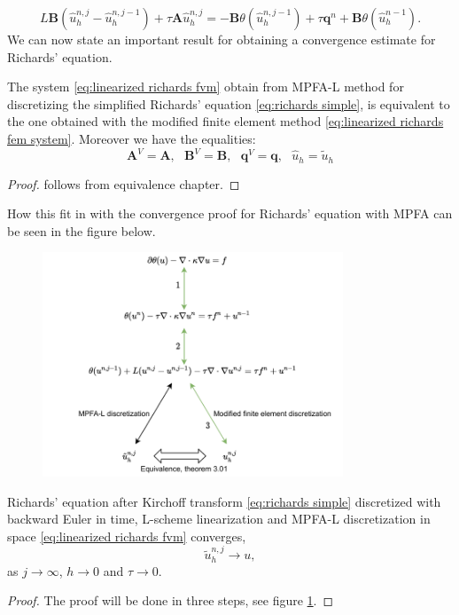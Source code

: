 \documentclass[../Main/main.tex]{subfiles}
\begin{document}
	\begin{equation}\label{eq:linearized richards fem system}
		L\pmb{B}(\hat{u}^{n,j}_h-\hat{u}^{n,j-1}_h) + \tau \pmb{A} \hat{u}_h^{n,j} = -\pmb{B} \theta (\hat{u}_h^{n,j-1})  + \tau \pmb{q}^n +  \pmb{B} \theta (\hat{u}_h^{n-1}).
	\end{equation}
	We can now state an important result for obtaining a convergence estimate for Richards' equation.
	\begin{lemma}
		The system \eqref{eq:linearized richards fvm} obtain from MPFA-L method for discretizing the simplified Richards' equation \eqref{eq:richards simple}, is equivalent to the one obtained with the modified finite element method \eqref{eq:linearized richards fem system}. Moreover we have the equalities: 
		\begin{equation}
			\pmb{A}^V = \pmb{A}, \ \ \ \pmb{B}^V = \pmb{B}, \ \ \ \pmb{q}^V = \pmb{q}, \ \ \ \hat{u}_h = \tilde{u}_h
		\end{equation}
		\begin{proof}
			follows from equivalence chapter.
		\end{proof}
	\end{lemma}
	How this fit in with the convergence proof for Richards' equation with MPFA can be seen in the figure below.
	\begin{figure}[H]
		\centering
		\includegraphics[width=0.8\textwidth]{convergence schema.pdf}
		\label{fig:convergence schema}
	\end{figure}
	\begin{theorem}
		Richards' equation after Kirchoff transform \eqref{eq:richards simple} discretized with backward Euler in time, L-scheme linearization and MPFA-L discretization in space \eqref{eq:linearized richards fvm} converges,
		\begin{equation}
			\tilde{u}_h^{n,j}\rightarrow u,
		\end{equation}
		as $j\rightarrow \infty$, $h\rightarrow 0$ and $\tau \rightarrow 0$.
	\end{theorem}
	\begin{proof}
		The proof will be done in three steps, see figure \ref{fig:convergence schema}.
	\end{proof}
	
\end{document}
